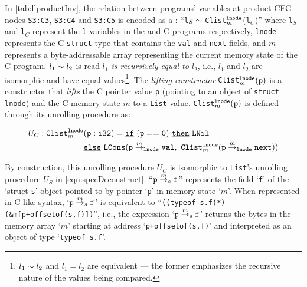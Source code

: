 In \cref{tab:llproductInv}, the relation between
programs' variables at product-CFG nodes {\tt S3:C3}, {\tt S3:C4} and {\tt S3:C5}
is encoded as a \recursiveRelation{}:
``{\tt l}$_{S}\sim{}${\tt Clist}$^{{\tt lnode}}_{m}$({\tt l}$_C$)'' where {\tt l}$_{S}$ and {\tt l}$_C$ represent the {\tt l} variables in the \SpecL{} and
C programs respectively, {\tt lnode} represents the C {\tt struct} type that contains
the {\tt val} and {\tt next} fields, and
$m$ represents a byte-addressable array representing
the current memory state of
the C program.
$l_1\sim{}l_2$ is read {\em $l_1$ is recursively equal to
$l_2$}, i.e., $l_1$ and $l_2$ are isomorphic and
have equal
values\footnote{$l_1\sim{}l_2$ and
$l_1=l_2$ are equivalent --- the former emphasizes
the recursive nature of the values being compared.}.
The {\em lifting constructor} {\tt Clist}$^{{\tt lnode}}_m({\tt p})$ is a
constructor that {\em lifts}
the C pointer value {\tt p} (pointing to
an object of {\tt struct lnode}) and the C
memory state $m$ to a \SpecL{} {\tt List} value.
{\tt Clist}$^{{\tt lnode}}_m({\tt p})$ is defined through its
unrolling procedure as:
\begin{small}
\begin{equation}\label{eqn:clist}
\begin{split}
U_C: \mathrm{\tt Clist}^{{\tt lnode}}_m&\mathrm{\tt (p:i32)} = \mathrm{\tt \underline{if}\ (p==0)}\ \mathrm{\tt \underline{then}\ }{\tt LNil} \\
                                                         & \mathrm{\tt \underline{else}\ {\tt LCons}(}{\tt p} \overset{m}{\rightarrow}_{{\tt lnode}} {\tt val},\ {\tt Clist}_m^{\tt lnode}({\tt p} \overset{m}{\rightarrow}_{{\tt lnode}} {\tt next}))
\end{split}
\end{equation}
\end{small}
By construction, this unrolling procedure $U_C$ is
isomorphic to {\tt List}'s  unrolling procedure $U_S$ in \cref{eqn:specDeconstruct}.
``{\small ${\tt p} \overset{m}{\rightarrow}_{s} {\tt f}$}'' represents the
field `{\tt f}' of the `struct {\tt s}' object pointed-to by pointer `{\tt p}'
in memory
state `$m$'.  When represented
in C-like syntax, `{\small ${\tt p} \overset{m}{\rightarrow}_{s} {\tt f}$}'
is equivalent to
``{\small {\tt *((typeof s.f)*)(\&m[p+offsetof(s,f)])}}'',
i.e., the expression `{\small ${\tt p} \overset{m}{\rightarrow}_{s} {\tt f}$}'
returns the bytes in the memory array `$m$' starting
at address `{\small {\tt p+offsetof(s,f)}}' and interpreted as an object of
type `{\small \tt typeof s.f}'.


